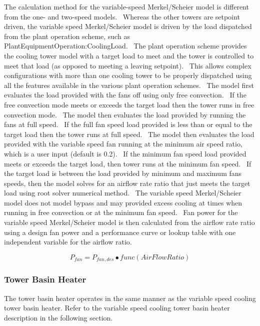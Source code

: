 The calculation method for the variable-speed Merkel/Scheier model is different from the one- and two-speed models.~ Whereas the other towers are setpoint driven, the variable speed Merkel/Scheier model is driven by the load dispatched from the plant operation scheme, such as PlantEquipmentOperation:CoolingLoad.~ The plant operation scheme provides the cooling tower model with a target load to meet and the tower is controlled to meet that load (as opposed to meeting a leaving setpoint).~ This allows complex configurations with more than one cooling tower to be properly dispatched using all the features available in the various plant operation schemes.~ The model first evaluates the load provided with the fans off using only free convection.~ If the free convection mode meets or exceeds the target load then the tower runs in free convection mode.~ The model then evaluates the load provided by running the fans at full speed.~ If the full fan speed load provided is less than or equal to the target load then the tower runs at full speed.~ The model then evaluates the load provided with the variable speed fan running at the minimum air speed ratio, which is a user input (default is 0.2).~ If the minimum fan speed load provided meets or exceeds the target load, then tower runs at the minimum fan speed.~ If the target load is between the load provided by minimum and maximum fans speeds, then the model solves for an airflow rate ratio that just meets the target load using root solver numerical method.~ The variable speed Merkel/Scheier model does not model bypass and may provided excess cooling at times when running in free convection or at the minimum fan speed.~ Fan power for the variable speed Merkel/Scheier model is then calculated from the airflow rate ratio using a design fan power and a performance curve or lookup table with one independent variable for the airflow ratio.

\begin{equation}
{P_{fan}} = {P_{fan,des}} \bullet func\left( {AirFlowRatio} \right)
\end{equation}

\subsubsection{Tower Basin Heater}\label{tower-basin-heater}

The tower basin heater operates in the same manner as the variable speed cooling tower basin heater. Refer to the variable speed cooling tower basin heater description in the following section.

